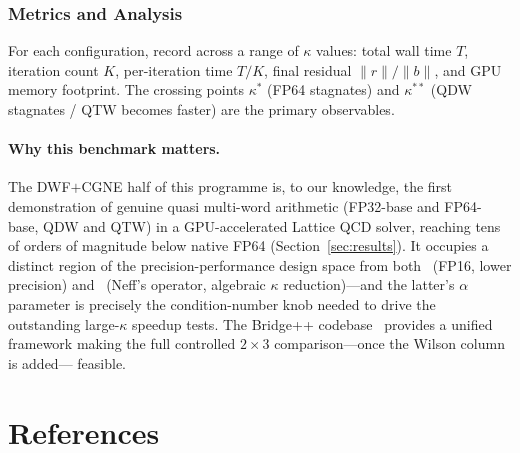 \documentclass[12pt,a4paper]{article}
\begin{document}
\subsubsection{Metrics and Analysis}

For each configuration, record across a range of $\kappa$ values:
total wall time $T$, iteration count $K$, per-iteration time $T/K$,
final residual $\|r\|/\|b\|$, and GPU memory footprint.
The crossing points $\kappa^*$ (FP64 stagnates) and $\kappa^{**}$
(QDW stagnates / QTW becomes faster) are the primary observables.

\paragraph{Why this benchmark matters.}
The DWF$+$CGNE half of this programme is, to our knowledge, the first
demonstration of genuine quasi multi-word arithmetic (FP32-base and FP64-base,
QDW and QTW) in a GPU-accelerated Lattice QCD solver, reaching tens of orders
of magnitude below native FP64 (Section~\ref{sec:results}).
It occupies a distinct region of the precision-performance design space
from both~\cite{Kanamori2026} (FP16, lower precision) and~\cite{Chen2026}
(Neff's operator, algebraic $\kappa$ reduction)---and the latter's $\alpha$
parameter is precisely the condition-number knob needed to drive the
outstanding large-$\kappa$ speedup tests.
The Bridge++ codebase~\cite{Chen2025} provides a unified framework making
the full controlled $2\times3$ comparison---once the Wilson column is added---
feasible.



\section*{References}
\end{document}
